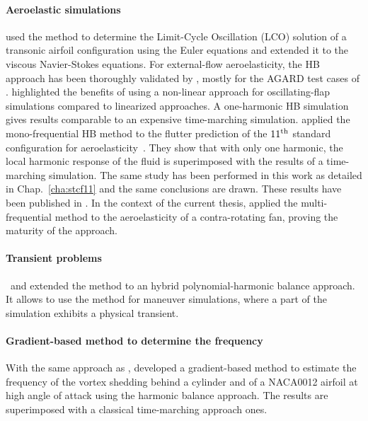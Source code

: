 \paragraph{Aeroelastic simulations}

\citet{Thomas2002a} used the method to
determine the Limit-Cycle Oscillation (LCO) solution
of a transonic airfoil configuration using the
Euler equations and \citet{Thomas2004b} extended
it to the viscous Navier-Stokes equations.
For external-flow aeroelasticity, the HB approach has 
been thoroughly 
validated by \citet{Gopinath2005, JSicot2008, Woodgate2009, JDufour2009}, 
mostly for the AGARD test cases of \citet{Davis1982}. 
\citet{JDufour2009} highlighted the benefits of using a 
non-linear approach for oscillating-flap simulations
compared to linearized approaches. A one-harmonic HB simulation
gives results comparable to an expensive time-marching simulation.
\citet{Huang2013} applied the mono-frequential
HB method to the flutter prediction of the 
$11\textsuperscript{th}$ 
standard configuration for aeroelasticity~\cite{Fransson1999}.
They show that with only one harmonic, the local
harmonic response of the fluid is superimposed
with the results of a time-marching simulation.
The same study has been performed in this work
as detailed in Chap.~\ref{cha:stcf11}
and the same conclusions are drawn. These results have been
published in \citet{JSicot2012}.
In the context of the current thesis,
\citet{JSicot2013} applied the multi-frequential method to the
aeroelasticity of a contra-rotating fan, proving
the maturity of the approach.


\paragraph{Transient problems}
\citet{Yang2010} and \citet{Mavriplis2012} extended the method to 
an hybrid polynomial-harmonic balance approach. 
It allows to use the method for maneuver simulations, 
where a part of the simulation exhibits a physical transient.

\paragraph{Gradient-based method to determine the frequency}
With the same approach as \citet{McMullen2002}, \citet{Gopinath2006}
developed a gradient-based method to estimate the frequency of the 
vortex shedding behind a cylinder and of a NACA0012 airfoil 
at high angle of attack using the harmonic balance approach.
The results are superimposed with a classical time-marching approach ones.

